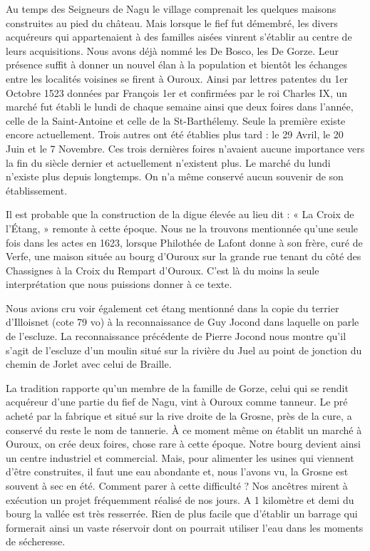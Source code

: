 Au temps des Seigneurs de Nagu le village comprenait les quelques maisons construites au pied du château. Mais lorsque le fief fut démembré, les divers acquéreurs qui appartenaient à des familles aisées vinrent s'établir au centre de leurs acquisitions. Nous avons déjà nommé les De Bosco, les De Gorze. Leur présence suffit à donner un nouvel élan à la population et bientôt les échanges entre les localités voisines se firent à Ouroux. Ainsi par lettres patentes du 1er Octobre 1523 données par François 1er et confirmées par le roi Charles IX, un marché fut établi le lundi de chaque semaine ainsi que deux foires dans l'année, celle de la Saint-Antoine et celle de la St-Barthélemy. Seule la première existe encore actuellement. Trois autres ont été établies plus tard : le 29 Avril, le 20 Juin et le 7 Novembre. Ces trois dernières foires n'avaient aucune importance vers la fin du siècle dernier et actuellement n'existent plus. Le marché du lundi n'existe plus depuis longtemps. On n'a même conservé aucun souvenir de son établissement.

Il est probable que la construction de la digue élevée au lieu dit : « La Croix de l'Étang, » remonte à cette époque. Nous ne la trouvons mentionnée qu'une seule fois dans les actes en 1623, lorsque Philothée de Lafont donne à son frère, curé de Verfe, une maison située au bourg d'Ouroux sur la grande rue tenant du côté des Chassignes à la Croix du Rempart d'Ouroux. C'est là du moins la seule interprétation que nous puissions donner à ce texte.

Nous avions cru voir également cet étang mentionné dans la copie du terrier d'Illoisnet (cote 79 vo) à la reconnaissance de Guy Jocond dans laquelle on parle de l'escluze. La reconnaissance précédente de Pierre Jocond nous montre qu'il s'agit de l'escluze d'un moulin situé sur la rivière du Juel au point de jonction du chemin de Jorlet avec celui de Braille.

La tradition rapporte qu'un membre de la famille de Gorze, celui qui se rendit acquéreur d'une partie du fief de Nagu, vint à Ouroux comme tanneur. Le pré acheté par la fabrique et situé sur la rive droite de la Grosne, près de la cure, a conservé du reste le nom de tannerie. À ce moment même on établit un marché à Ouroux, on crée
deux foires, chose rare à cette époque. Notre bourg devient ainsi un centre industriel et commercial. Mais, pour alimenter les usines qui viennent d'être construites, il faut une eau abondante et, nous l'avons vu, la Grosne est souvent à sec en été. Comment parer à cette difficulté ? Nos ancêtres mirent à exécution un projet fréquemment réalisé de nos jours. A 1 kilomètre et demi du bourg la vallée est très resserrée. Rien de plus facile que d'établir un barrage qui formerait ainsi un vaste réservoir dont on pourrait utiliser l'eau dans les moments de sécheresse.

